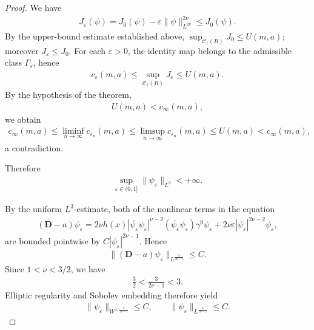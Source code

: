 \documentclass[10pt,a4paper]{amsart}
\newcommand{\eps}{\varepsilon}
\newcommand{\pD}{\mathbf{D}}
\begin{document}
\begin{proof}
We have
\begin{align}
J_\eps(\psi)=J_0(\psi)-\eps\|\psi\|_{L^{2\nu}}^{2\nu}
\le J_0(\psi).
\end{align}
By the upper-bound estimate established above,
$\sup_{\mathscr C_1(R)}J_0\le U(m,a)$; moreover $J_\eps\le J_0$. For each $\eps>0$, the identity map belongs to the admissible class $\Gamma_\eps$, hence
\begin{align}
c_\eps(m,a)
\le
\sup_{\mathscr C_1(R)}J_\eps
\le U(m,a).
\end{align}
By the hypothesis of the theorem,
\begin{align}
U(m,a)<c_\infty(m,a),
\end{align}
we obtain
\begin{align}
c_\infty(m,a)
\le
\liminf_{n\to\infty}c_{\eps_n}(m,a)
\le
\limsup_{n\to\infty}c_{\eps_n}(m,a)
\le U(m,a)
<c_\infty(m,a),
\end{align}
a contradiction.

Therefore
\begin{align}
\sup_{\eps\in(0,1]}
\|\psi_\eps\|_{L^3}<+\infty.
\end{align}

By the uniform $L^3$-estimate, both of the nonlinear terms in the equation
\begin{align}
(\pD-a)\psi_\eps
=
2\nu h(x)|\overline{\psi_\eps}\psi_\eps|^{\nu-2}
(\overline{\psi_\eps}\psi_\eps)\gamma^0\psi_\eps
+
2\nu\eps|\psi_\eps|^{2\nu-2}\psi_\eps,
\end{align}
are bounded pointwise by $C|\psi_\eps|^{2\nu-1}$. Hence
\begin{align}
\|(\pD-a)\psi_\eps\|_{L^{\frac{3}{2\nu-1}}}
\le C.
\end{align}
Since $1<\nu<3/2$, we have
\begin{align}
\frac32<\frac{3}{2\nu-1}<3.
\end{align}
Elliptic regularity and Sobolev embedding therefore yield
\begin{align}
\|\psi_\eps\|_{W^{1,\frac{3}{2\nu-1}}}\le C,
\qquad
\|\psi_\eps\|_{L^{\frac{3}{2\nu-2}}}\le C.
\end{align}


\end{proof}
\end{document}
